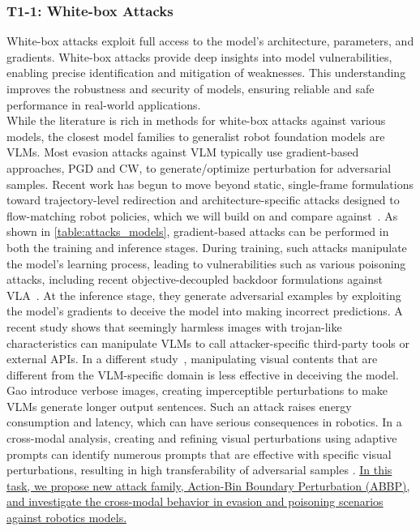 \subsubsection{T1-1: White-box Attacks} \label{sec:t1_1}

White-box attacks exploit full access to the model's architecture, parameters, and gradients.
White-box attacks provide deep insights into model vulnerabilities, enabling precise identification and mitigation of weaknesses. This understanding improves the robustness and security of models, ensuring reliable and safe performance in real-world applications.
\\
 While the literature is rich in methods for white-box attacks against various models, the closest model families to generalist robot foundation models are VLMs.
Most evasion attacks against VLM \cite{schlarmann2023adversarial, bailey2023image,gao2024adversarial,wang2024stop,tan2024wolf} typically use gradient-based approaches, \eg PGD and CW, to generate/optimize perturbation for adversarial samples.
Recent work has begun to move beyond static, single-frame formulations toward trajectory-level redirection and architecture-specific attacks designed to flow-matching robot policies, which we will build on and compare against~\cite{puthumanaillam2026trajectory,tae2026drift}.
As shown in \autoref{table:attacks_models}, gradient-based attacks can be performed in both the training and inference stages. During training, such attacks manipulate the model's learning process, leading to vulnerabilities such as various poisoning attacks, including recent objective-decoupled backdoor formulations against  VLA~\cite{zhou2025badvla}. At the inference stage, they generate adversarial examples by exploiting the model's gradients to deceive the model into making incorrect predictions. 
A recent study \cite{fu2023misusing} shows that seemingly harmless images with trojan-like characteristics can manipulate VLMs to call attacker-specific  third-party tools or external APIs. 
In a different study~\cite{cui2023robustness}, manipulating visual contents that are different from the VLM-specific domain is less effective in deceiving the model. 
Gao \etal \cite{gao2024inducing} introduce verbose images, creating imperceptible perturbations to make VLMs generate longer output sentences. Such an attack raises energy consumption and latency, which can have serious consequences in robotics.
In a cross-modal analysis, creating and refining visual perturbations using adaptive prompts can identify numerous prompts that are effective with specific visual perturbations, resulting in high transferability of adversarial samples \cite{luo2024image}.
\ul{In this task, we propose new attack family, Action-Bin Boundary Perturbation (ABBP), and investigate the cross-modal behavior in evasion and poisoning scenarios against robotics models.}


